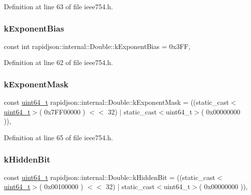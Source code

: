 Definition at line 63 of file ieee754.\+h.

\mbox{\label{classrapidjson_1_1internal_1_1_double_a98d3cd7a5e045d754913d998145dd5db}} 
\subsubsection{\texorpdfstring{kExponentBias}{kExponentBias}}
{\footnotesize\ttfamily const int rapidjson\+::internal\+::\+Double\+::k\+Exponent\+Bias = 0x3\+FF\hspace{0.3cm}{\ttfamily [static]}, {\ttfamily [private]}}



Definition at line 62 of file ieee754.\+h.

\mbox{\label{classrapidjson_1_1internal_1_1_double_a5e4e25bf99c4378e35ce6c435ecfb113}} 
\subsubsection{\texorpdfstring{kExponentMask}{kExponentMask}}
{\footnotesize\ttfamily const \mbox{\hyperlink{stdint_8h_aec6fcb673ff035718c238c8c9d544c47}{uint64\+\_\+t}} rapidjson\+::internal\+::\+Double\+::k\+Exponent\+Mask = ((static\+\_\+cast$<$\mbox{\hyperlink{stdint_8h_aec6fcb673ff035718c238c8c9d544c47}{uint64\+\_\+t}}$>$( 0x7\+F\+F00000 ) $<$$<$ 32) $\vert$ static\+\_\+cast$<$uint64\+\_\+t$>$( 0x00000000 ))\hspace{0.3cm}{\ttfamily [static]}, {\ttfamily [private]}}



Definition at line 65 of file ieee754.\+h.

\mbox{\label{classrapidjson_1_1internal_1_1_double_a9a209f4e38c947ba2fe18ca9479ce939}} 
\subsubsection{\texorpdfstring{kHiddenBit}{kHiddenBit}}
{\footnotesize\ttfamily const \mbox{\hyperlink{stdint_8h_aec6fcb673ff035718c238c8c9d544c47}{uint64\+\_\+t}} rapidjson\+::internal\+::\+Double\+::k\+Hidden\+Bit = ((static\+\_\+cast$<$\mbox{\hyperlink{stdint_8h_aec6fcb673ff035718c238c8c9d544c47}{uint64\+\_\+t}}$>$( 0x00100000 ) $<$$<$ 32) $\vert$ static\+\_\+cast$<$uint64\+\_\+t$>$( 0x00000000 ))\hspace{0.3cm}{\ttfamily [static]}, {\ttfamily [private]}}



